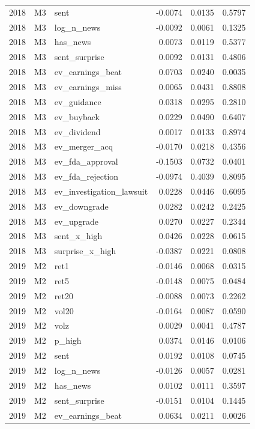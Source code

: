 \begin{tabular}{rllrrr}
2018 & M3 & sent & -0.0074 & 0.0135 & 0.5797 \\
2018 & M3 & log\_n\_news & -0.0092 & 0.0061 & 0.1325 \\
2018 & M3 & has\_news & 0.0073 & 0.0119 & 0.5377 \\
2018 & M3 & sent\_surprise & 0.0092 & 0.0131 & 0.4806 \\
2018 & M3 & ev\_earnings\_beat & 0.0703 & 0.0240 & 0.0035 \\
2018 & M3 & ev\_earnings\_miss & 0.0065 & 0.0431 & 0.8808 \\
2018 & M3 & ev\_guidance & 0.0318 & 0.0295 & 0.2810 \\
2018 & M3 & ev\_buyback & 0.0229 & 0.0490 & 0.6407 \\
2018 & M3 & ev\_dividend & 0.0017 & 0.0133 & 0.8974 \\
2018 & M3 & ev\_merger\_acq & -0.0170 & 0.0218 & 0.4356 \\
2018 & M3 & ev\_fda\_approval & -0.1503 & 0.0732 & 0.0401 \\
2018 & M3 & ev\_fda\_rejection & -0.0974 & 0.4039 & 0.8095 \\
2018 & M3 & ev\_investigation\_lawsuit & 0.0228 & 0.0446 & 0.6095 \\
2018 & M3 & ev\_downgrade & 0.0282 & 0.0242 & 0.2425 \\
2018 & M3 & ev\_upgrade & 0.0270 & 0.0227 & 0.2344 \\
2018 & M3 & sent\_x\_high & 0.0426 & 0.0228 & 0.0615 \\
2018 & M3 & surprise\_x\_high & -0.0387 & 0.0221 & 0.0808 \\
2019 & M2 & ret1 & -0.0146 & 0.0068 & 0.0315 \\
2019 & M2 & ret5 & -0.0148 & 0.0075 & 0.0484 \\
2019 & M2 & ret20 & -0.0088 & 0.0073 & 0.2262 \\
2019 & M2 & vol20 & -0.0164 & 0.0087 & 0.0590 \\
2019 & M2 & volz & 0.0029 & 0.0041 & 0.4787 \\
2019 & M2 & p\_high & 0.0374 & 0.0146 & 0.0106 \\
2019 & M2 & sent & 0.0192 & 0.0108 & 0.0745 \\
2019 & M2 & log\_n\_news & -0.0126 & 0.0057 & 0.0281 \\
2019 & M2 & has\_news & 0.0102 & 0.0111 & 0.3597 \\
2019 & M2 & sent\_surprise & -0.0151 & 0.0104 & 0.1445 \\
2019 & M2 & ev\_earnings\_beat & 0.0634 & 0.0211 & 0.0026 \\

\end{tabular}
